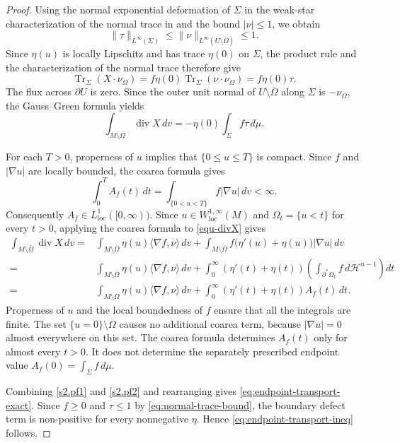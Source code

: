 \documentclass[11pt,reqno]{amsart}
\numberwithin{equation}{section}
\theoremstyle{definition}
\newcommand{\dd}{\,d}
\newcommand{\diver}{\operatorname{div}}
\begin{document}
\begin{proof}
Using the normal exponential deformation of $\Sigma$ in the weak-star characterization of the normal
trace in \cite[Theorem~2.2(iii)]{ChenFrid1999} and the bound
$|\nu|\leq1$, we obtain
\begin{equation}\label{eq:normal-trace-bound}
    \|\tau\|_{L^\infty(\Sigma)}
    \leq
    \|\nu\|_{L^\infty(U\setminus\overline\Omega)}
    \leq1.
\end{equation}
Since $\eta(u)$ is locally Lipschitz and has trace
$\eta(0)$ on $\Sigma$, the product rule and the characterization of the normal trace therefore give
\begin{equation*}
    \operatorname{Tr}_\Sigma(X\cdot\nu_\Omega)
    =
    f\eta(0)\operatorname{Tr}_\Sigma(\nu\cdot\nu_\Omega)
    =
    f\eta(0)\tau.
\end{equation*} 
The flux across $\partial U$ is zero.  Since the outer unit normal of $U\setminus\overline\Omega$ along $\Sigma$ is $-\nu_\Omega$, the Gauss--Green formula yields
\begin{equation}\label{s2.pf1}
    \int_{M\setminus\overline\Omega}\diver X\,dv
    =-\eta(0)\int_\Sigma f\tau\,d\mu.
\end{equation}

For each $T>0$, properness of $u$ implies that $\{0\leq u\leq T\}$ is compact. Since $f$ and $|\nabla u|$ are locally bounded, the coarea formula gives
\begin{equation*}
    \int_0^T A_f(t) \dd t = \int_{\{0<u<T\}} f |\nabla u| \dd v<\infty.
\end{equation*}
Consequently $A_f\in L_{\mathrm{loc}}^1([0,\infty))$. Since $u\in W_{\mathrm{loc}}^{1,\infty}(M)$ and
$\Omega_t=\{u<t\}$ for every $t>0$, applying the coarea formula to \eqref{equ-divX} gives
\begin{align}\label{s2.pf2}
 \int_{M\setminus\overline\Omega}\diver X\,dv
   =&  \int_{M\setminus\overline\Omega}\eta(u)\langle\nabla f,\nu\rangle \,dv+
    \int_{M\setminus\overline\Omega}
        f\bigl(\eta'(u)+\eta(u)\bigr)|\nabla u|\,dv\nonumber\\
    =&\int_{M\setminus\overline\Omega}\eta(u)\langle\nabla f,\nu\rangle \,dv+
    \int_0^\infty
        (\eta'(t)+\eta(t))
        \left(
            \int_{\partial^*\Omega_t}
                f\,d\mathcal H^{n-1}
        \right)dt \nonumber\\
    =&\int_{M\setminus\overline\Omega}\eta(u)\langle\nabla f,\nu\rangle \,dv+
    \int_0^\infty
        (\eta'(t)+\eta(t))A_f(t)\,dt.
\end{align}
Properness of $u$ and the local boundedness of $f$ ensure that all the integrals are finite. The set $\{u=0\}\setminus\overline\Omega$ causes no additional coarea term, because $|\nabla u|=0$ almost everywhere on this set. The coarea formula determines $A_f(t)$ only for almost every $t>0$. It does not determine the separately prescribed endpoint value $A_f(0)=\int_\Sigma f\,d\mu$.

Combining \eqref{s2.pf1} and \eqref{s2.pf2} and rearranging gives \eqref{eq:endpoint-transport-exact}.  Since $f\geq0$ and $\tau\leq1$ by \eqref{eq:normal-trace-bound}, the boundary defect term is non-positive
for every nonnegative $\eta$.  Hence
\eqref{eq:endpoint-transport-ineq} follows.
\end{proof}
\end{document}
